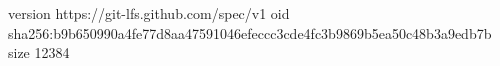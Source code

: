 version https://git-lfs.github.com/spec/v1
oid sha256:b9b650990a4fe77d8aa47591046efeccc3cde4fc3b9869b5ea50c48b3a9edb7b
size 12384
